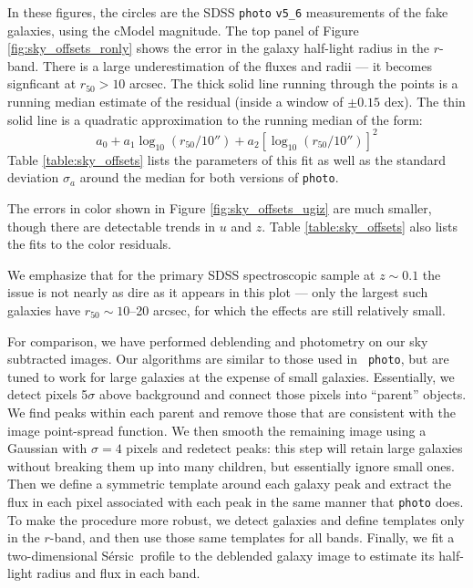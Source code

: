 \documentclass[10pt,preprint]{aastex}
\newcommand{\Sersic}{S\'ersic}
\begin{document}
In these figures, the circles are the SDSS {\tt photo} {\tt v5\_6}
measurements of the fake galaxies, using the cModel magnitude.  The
top panel of Figure \ref{fig:sky_offsets_ronly} shows the error in the
galaxy half-light radius in the $r$-band. There is a large
underestimation of the fluxes and radii --- it becomes signficant at
$r_{50}>10$ arcsec. The thick solid line running through the points is
a running median estimate of the residual (inside a window of $\pm
0.15$ dex). The thin solid line is a quadratic approximation to the
running median of the form:
\begin{equation}
\label{eq:sky_offsets_model}
a_0 + a_1 \log_{10}\left(r_{50}/10''\right)
+ a_2 \left[\log_{10}\left(r_{50}/10''\right)\right]^2
\end{equation}
Table \ref{table:sky_offsets} lists the parameters of this fit as well
as the standard deviation $\sigma_a$ around the median for both
versions of {\tt photo}.

The errors in color shown in Figure \ref{fig:sky_offsets_ugiz} are
much smaller, though there are detectable trends in $u$ and $z$. Table
\ref{table:sky_offsets} also lists the fits to the color residuals.

We emphasize that for the primary SDSS spectroscopic sample at $z\sim
0.1$ the issue is not nearly as dire as it appears in this plot ---
only the largest such galaxies have $r_{50}\sim 10$--20 arcsec, for
which the effects are still relatively small.

For comparison, we have performed deblending and photometry on our sky
subtracted images.  Our algorithms are similar to those used in {\tt
  photo}, but are tuned to work for large galaxies at the expense of
small galaxies. Essentially, we detect pixels 5$\sigma$ above
background and connect those pixels into ``parent'' objects. We find
peaks within each parent and remove those that are consistent with the
image point-spread function. We then smooth the remaining image using
a Gaussian with $\sigma=4$ pixels and redetect peaks: this step will
retain large galaxies without breaking them up into many children, but
essentially ignore small ones. Then we define a symmetric template
around each galaxy peak and extract the flux in each pixel associated
with each peak in the same manner that {\tt photo} does. To make the
procedure more robust, we detect galaxies and define templates only in
the $r$-band, and then use those same templates for all
bands. Finally, we fit a two-dimensional \Sersic\ profile to the
deblended galaxy image to estimate its half-light radius and flux in
each band.
\end{document}
